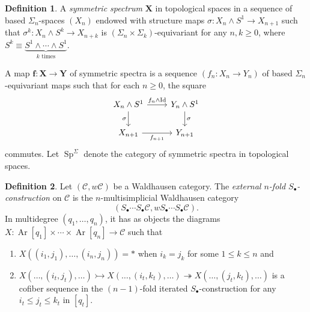 \documentclass[10pt,letterpaper,cm]{nupset}
\theoremstyle{definition}
\newtheorem{definition}{Definition}[section]
\theoremstyle{theorem}
\theoremstyle{remark}
\newcommand{\X}{\mathbf X}
\newcommand{\1}{\mathbf{1}}
\renewcommand{\c}{\mathscr{C}}
\newcommand{\0}{\vec 0}
\DeclareMathOperator{\id}{Id}
\DeclareMathOperator{\Ar}{Ar}
\DeclareMathOperator{\Sp}{Sp}
\begin{document}
\begin{definition}
 A \textit{symmetric spectrum} $\X$ in topological spaces in a sequence of based $\Sigma_n$-spaces $(X_n)$ endowed with structure maps $\sigma : X_n \land S^1 \to X_{n+1}$ such that $\sigma^k : X_n \land S^k \to X_{n+k}$ is $\left(\Sigma_{n}\times \Sigma_{k}\right)$-equivariant for any $n,k\geq 0$, where $S^k \equiv \underbrace{S^1 \land \cdots \land S^1}_{k\text{ times}}$. 
 
 \smallskip
 
 A map $\mathbf{f} : \X \to \mathbf{Y}$ of symmetric spectra is a sequence $\left(f_n : X_n \to Y_n\right)$ of based $\Sigma_n$-equivariant maps such that for each $n\geq 0$, the square
\[
\begin{tikzcd}
X_n \land S^1 \arrow[d, "\sigma"'] \arrow[r, "f_n \land \id"] & Y_n \land S^1 \arrow[d, "\sigma"] \\
X_{n+1} \arrow[r, "f_{n+1}"'] & Y_{n+1}
\end{tikzcd}
\]
commutes. Let $\Sp^{\Sigma}$ denote the category of symmetric spectra in topological spaces.
\end{definition}

\begin{definition}
Let $(\c,w{\c})$ be a Waldhausen category. The \textit{external $n$-fold $S_{\bullet}$-construction} on $\c$ is the $n$-multisimplicial Waldhausen category $$\left(S_{\bullet}\cdots S_{\bullet}\c, wS_{\bullet} \cdots S_{\bullet} \c\right).$$ In multidegree $\left(q_1, \ldots, q_n\right)$, it has as objects the diagrams  $X: \Ar[q_1] \times \cdots \times \Ar[q_n] \to \c$ such that
\begin{enumerate}[label=(\roman*)]
\item $X((i_1, j_1), \ldots, (i_n, j_n)) = \ast$ when $i_k = j_k$ for some $1\leq k \leq n$ and
\item $X(\ldots, (i_t, j_t), \ldots) \rightarrowtail X(\ldots, (i_t, k_t), \ldots) \twoheadrightarrow X(\ldots, (j_t, k_t), \ldots)$ is a cofiber sequence  in the $(n-1)$-fold iterated $S_{\bullet}$-construction for any $i_t \leq j_t \leq k_t$ in $[q_t]$.
\end{enumerate}
\end{definition}
\end{document}

